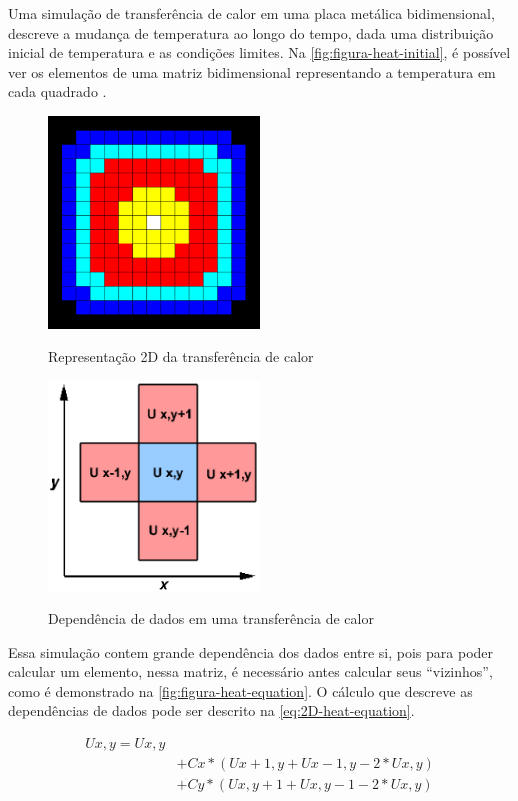 Uma simulação de transferência de calor em uma placa metálica bidimensional, descreve a mudança de temperatura ao longo do tempo, dada uma distribuição inicial de temperatura e as condições limites.
Na \autoref{fig:figura-heat-initial}, é possível ver os elementos de uma matriz bidimensional representando a temperatura em cada quadrado \cite{theinparallel}.

\begin{figure}[!htb]
    \centering
    \caption{Representação 2D da transferência de calor}
    \includegraphics[width=0.5\textwidth]{./dados/figuras/heat_initial}
    \label{fig:figura-heat-initial}
\end{figure}

\begin{figure}[!htb]
    \centering
    \caption{Dependência de dados em uma transferência de calor}
    \includegraphics[width=0.5\textwidth]{./dados/figuras/heat_equation}
    \label{fig:figura-heat-equation}
\end{figure}

Essa simulação contem grande dependência dos dados entre si, pois para poder calcular um elemento, nessa matriz, é necessário antes calcular seus “vizinhos”, como é demonstrado na \autoref{fig:figura-heat-equation}.
O cálculo que descreve as dependências de dados pode ser descrito na \autoref{eq:2D-heat-equation}.

\begin{align}
    Ux,y = Ux,y  \nonumber \\
               & + Cx * (Ux+1,y + Ux-1,y - 2 * Ux,y) \nonumber \\
               & + Cy * (Ux,y+1 + Ux,y-1 - 2 * Ux,y)
    \label{eq:2D-heat-equation}
\end{align}
